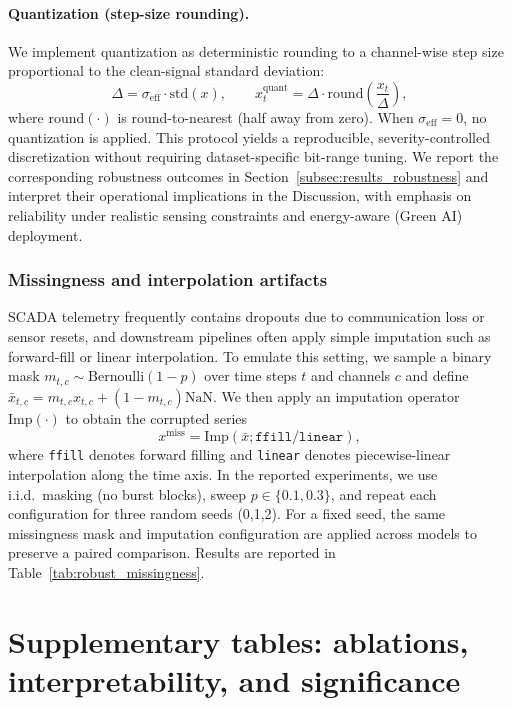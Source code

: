 \documentclass[review,3p,times]{elsarticle}
\begin{document}
\paragraph{Quantization (step-size rounding).}
We implement quantization as deterministic rounding to a channel-wise step size proportional to the clean-signal standard deviation:
\begin{equation}
\Delta = \sigma_{\mathrm{eff}}\cdot \mathrm{std}(x),\qquad
x^{\text{quant}}_t = \Delta\cdot \mathrm{round}\!\left(\frac{x_t}{\Delta}\right),
\end{equation}
where $\mathrm{round}(\cdot)$ is round-to-nearest (half away from zero). When $\sigma_{\mathrm{eff}}=0$, no quantization is applied. This protocol yields a reproducible, severity-controlled discretization without requiring dataset-specific bit-range tuning. We report the corresponding robustness outcomes in Section~\ref{subsec:results_robustness} and interpret their operational implications in the Discussion, with emphasis on reliability under realistic sensing constraints and energy-aware (Green AI) deployment.



\subsubsection{Missingness and interpolation artifacts}
SCADA telemetry frequently contains dropouts due to communication loss or sensor resets, and downstream pipelines often apply simple imputation such as forward-fill or linear interpolation. To emulate this setting, we sample a binary mask $m_{t,c}\sim\mathrm{Bernoulli}(1-p)$ over time steps $t$ and channels $c$ and define $\bar{x}_{t,c}=m_{t,c}x_{t,c}+(1-m_{t,c})\mathrm{NaN}$. We then apply an imputation operator $\mathrm{Imp}(\cdot)$ to obtain the corrupted series
\begin{equation}
x^{\text{miss}}=\mathrm{Imp}(\bar{x};\texttt{ffill/linear}),
\end{equation}
where \texttt{ffill} denotes forward filling and \texttt{linear} denotes piecewise-linear interpolation along the time axis. In the reported experiments, we use i.i.d.\ masking (no burst blocks), sweep $p\in\{0.1,0.3\}$, and repeat each configuration for three random seeds (0,1,2). For a fixed seed, the same missingness mask and imputation configuration are applied across models to preserve a paired comparison. Results are reported in Table~\ref{tab:robust_missingness}.
\section{Supplementary tables: ablations, interpretability, and significance}\label{app:supp_tables}
\end{document}
